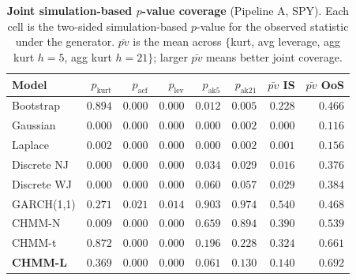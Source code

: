 \begin{table}[t]
\centering
\small
\caption{\textbf{Joint simulation-based $p$-value coverage} (Pipeline A, SPY). Each cell is the two-sided simulation-based $p$-value for the observed statistic under the generator. $\bar{pv}$ is the mean across $\{$kurt, avg leverage, agg kurt $h = 5$, agg kurt $h = 21\}$; larger $\bar{pv}$ means better joint coverage.}
\label{tab:sim_pvalues}
\begin{tabular}{lrrrrr|rr}
\toprule
Model & $p_{\text{kurt}}$ & $p_{\text{acf}}$ & $p_{\text{lev}}$ & $p_{\text{ak5}}$ & $p_{\text{ak21}}$ & $\bar{pv}$ IS & $\bar{pv}$ OoS \\
\midrule
Bootstrap   & $0.894$ & $0.000$ & $0.000$ & $0.012$ & $0.005$ & $0.228$ & $0.466$ \\
Gaussian    & $0.000$ & $0.000$ & $0.000$ & $0.000$ & $0.002$ & $0.000$ & $0.116$ \\
Laplace     & $0.002$ & $0.000$ & $0.000$ & $0.000$ & $0.002$ & $0.001$ & $0.156$ \\
Discrete NJ & $0.000$ & $0.000$ & $0.000$ & $0.034$ & $0.029$ & $0.016$ & $0.376$ \\
Discrete WJ & $0.000$ & $0.000$ & $0.000$ & $0.060$ & $0.057$ & $0.029$ & $0.384$ \\
GARCH(1,1)  & $0.271$ & $0.021$ & $0.014$ & $0.903$ & $0.974$ & $0.540$ & $0.468$ \\
CHMM-N      & $0.009$ & $0.000$ & $0.000$ & $0.659$ & $0.894$ & $0.390$ & $0.539$ \\
CHMM-t      & $0.872$ & $0.000$ & $0.000$ & $0.196$ & $0.228$ & $0.324$ & $0.661$ \\
\textbf{CHMM-L} & $0.369$ & $0.000$ & $0.000$ & $0.061$ & $0.130$ & $0.140$ & $\mathbf{0.692}$ \\
\bottomrule
\end{tabular}
\end{table}

